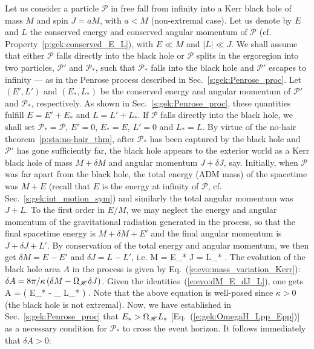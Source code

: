 Let us consider a particle $\mathscr{P}$ in free fall from infinity into a
Kerr black hole of mass $M$ and spin $J= a M$, with
$a < M$ (non-extremal case). Let us denote by $E$ and $L$ the
conserved energy and conserved angular momentum of $\mathscr{P}$ (cf. Property~\ref{p:gek:conserved_E_L}), with $E\ll M$ and $|L| \ll J$.
We shall assume that either $\mathscr{P}$ falls directly into the black hole or
$\mathscr{P}$ splits in the ergoregion into
two particles, $\mathscr{P}'$ and $\mathscr{P}_*$,
such that $\mathscr{P}_*$ falls into the black hole and $\mathscr{P}'$
escapes to infinity --- as in the Penrose process described
in Sec.~\ref{s:gek:Penrose_proc}.
Let $(E',L')$ and $(E_*,L_*)$ be the conserved
energy and angular momentum of $\mathscr{P}'$ and $\mathscr{P}_*$, respectively.
As shown in Sec.~\ref{s:gek:Penrose_proc}, these quantities fulfill
$E = E' + E_*$ and $L = L' + L_*$. If $\mathscr{P}$ falls directly into the black hole,
we shall set $\mathscr{P}_* = \mathscr{P}$,
$E'=0$, $E_*=E$, $L'=0$ and $L_*=L$.
By virtue of the no-hair theorem~\ref{p:sta:no-hair_thm},
after $\mathscr{P}_*$ has been captured by the black hole and
$\mathscr{P}'$ has gone sufficiently far,
the black hole
appears to the exterior world as a Kerr black hole of mass $M +\delta M$
and angular momentum $J + \delta J$, say.
Initially, when $\mathscr{P}$ was far apart from the black hole, the total energy (ADM mass)
of the spacetime was $M + E$ (recall that $E$ is the energy at infinity
of $\mathscr{P}$, cf. Sec.~\ref{s:gek:int_motion_sym}) and similarly the
total angular momentum was $J + L$.
To the first order in $E/M$, we may neglect the energy and angular momentum
of the gravitational radiation generated in the process, so that the final spacetime energy is
$M + \delta M + E'$ and the final angular momentum is $J + \delta J + L'$.
By conservation of the total energy and angular momentum, we then get
$\delta M = E - E'$ and $\delta J = L - L'$, i.e.
\be \label{e:evo:dM_E_dJ_L}
    \delta M = E_* \qand \delta J = L_* .
\ee
The evolution of the black hole area $A$ in the process is given by Eq.~(\ref{e:evo:mass_variation_Kerr}):\\
$\delta A = 8\pi/\kappa \left( \delta M - \Omega_{\mathscr{H}} \delta J \right)$.
Given the identities~(\ref{e:evo:dM_E_dJ_L}), one gets
\be \label{e:evo:dA_Estar_Jstar}
    \delta A = \frac{8\pi}{\kappa} \left( E_* - \Omega_{\Hor}  L_* \right) .
\ee
Note that the above equation is well-posed since $\kappa > 0$ (the black hole is not extremal).
Now, we have established in Sec.~\ref{s:gek:Penrose_proc} that
$E_* > \Omega_{\mathscr{H}}  L_*$ [Eq.~(\ref{e:gek:OmegaH_Lpp_Epp})] as
a necessary condition for $\mathscr{P}_*$ to cross the event horizon.
It follows immediately that $\delta A > 0$:

